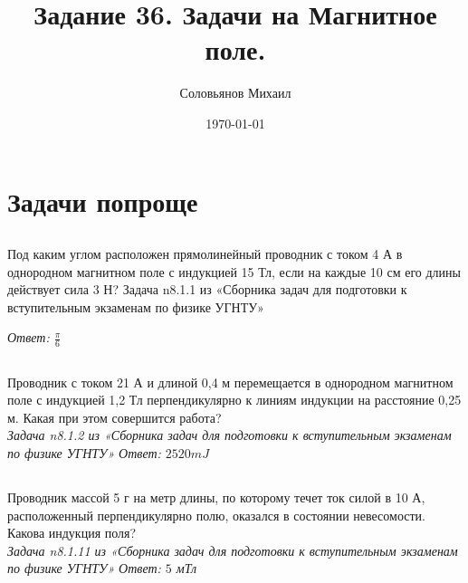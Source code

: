 \documentclass[a4paper,12pt]{article} %
\author{Соловьянов Михаил }
\title{Задание 36. Задачи на Магнитное поле.}
\date{\today}
\begin{document}
\maketitle

\section{Задачи попроще}
\subsection{}
Под каким углом расположен прямолинейный проводник с током 4 А в однородном магнитном поле с индукцией 15 Тл, если на каждые 10 см его длины действует сила 3 Н? Задача n8.1.1 из «Сборника задач для подготовки к вступительным экзаменам по физике УГНТУ»



\textit{Ответ: $\frac{\pi}{6}$}

\subsection{}
  Проводник с током 21 А и длиной 0,4 м перемещается в однородном магнитном поле с индукцией 1,2 Тл перпендикулярно к линиям индукции на расстояние 0,25 м. Какая при этом совершится работа? \\ \textit{ Задача n8.1.2 из «Сборника задач для подготовки к вступительным экзаменам по физике УГНТУ»}
\textit{Ответ: $2520 mJ$}


\subsection{}

Проводник массой 5 г на метр длины, по которому течет ток силой в 10 А, расположенный перпендикулярно полю, оказался в состоянии невесомости. Какова индукция поля?\\ \textit{ Задача n8.1.11 из «Сборника задач для подготовки к вступительным экзаменам по физике УГНТУ»}
\textit{Ответ: $5$ мТл}
\end{document}
